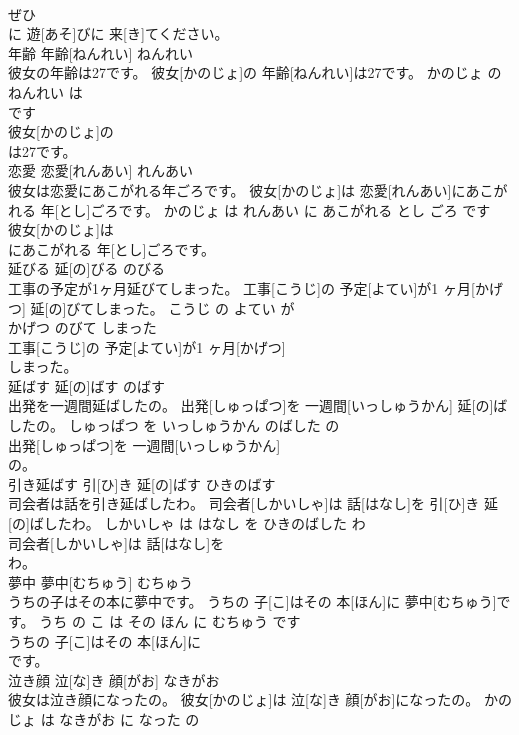 \documentclass[8pt]{extreport}
\begin{document}
\begin{CJK}{UTF8}{min}
\\	ぜひ
\\	に 遊[あそ]びに 来[き]てください。			
\\	年齢	年齢[ねんれい]	ねんれい	
\\	彼女の年齢は27です。	彼女[かのじょ]の 年齢[ねんれい]は27です。	かのじょ の ねんれい は 
\\	です	
\\	彼女[かのじょ]の
\\	は27です。			
\\	恋愛	恋愛[れんあい]	れんあい	
\\	彼女は恋愛にあこがれる年ごろです。	彼女[かのじょ]は 恋愛[れんあい]にあこがれる 年[とし]ごろです。	かのじょ は れんあい に あこがれる とし ごろ です	
\\	彼女[かのじょ]は
\\	にあこがれる 年[とし]ごろです。			
\\	延びる	延[の]びる	のびる	
\\	工事の予定が1ヶ月延びてしまった。	工事[こうじ]の 予定[よてい]が1 ヶ月[かげつ] 延[の]びてしまった。	こうじ の よてい が 
\\	かげつ のびて しまった	
\\	工事[こうじ]の 予定[よてい]が1 ヶ月[かげつ]
\\	しまった。			
\\	延ばす	延[の]ばす	のばす	
\\	出発を一週間延ばしたの。	出発[しゅっぱつ]を 一週間[いっしゅうかん] 延[の]ばしたの。	しゅっぱつ を いっしゅうかん のばした の	
\\	出発[しゅっぱつ]を 一週間[いっしゅうかん]
\\	の。			
\\	引き延ばす	引[ひ]き 延[の]ばす	ひきのばす	
\\	司会者は話を引き延ばしたわ。	司会者[しかいしゃ]は 話[はなし]を 引[ひ]き 延[の]ばしたわ。	しかいしゃ は はなし を ひきのばした わ	
\\	司会者[しかいしゃ]は 話[はなし]を
\\	わ。			
\\	夢中	夢中[むちゅう]	むちゅう	
\\	うちの子はその本に夢中です。	うちの 子[こ]はその 本[ほん]に 夢中[むちゅう]です。	うち の こ は その ほん に むちゅう です	
\\	うちの 子[こ]はその 本[ほん]に
\\	です。			
\\	泣き顔	泣[な]き 顔[がお]	なきがお	
\\	彼女は泣き顔になったの。	彼女[かのじょ]は 泣[な]き 顔[がお]になったの。	かのじょ は なきがお に なった の	

\end{CJK}
\end{document}
